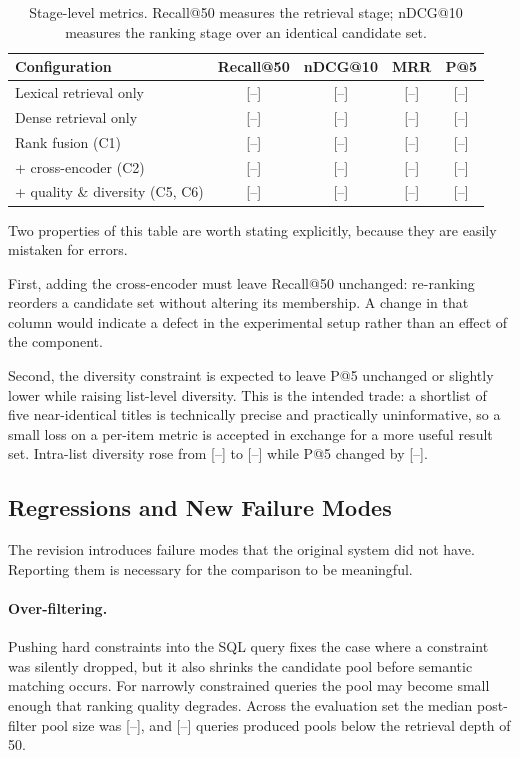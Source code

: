 \begin{table}[h]
\centering
\caption{Stage-level metrics. Recall@50 measures the retrieval stage; nDCG@10
measures the ranking stage over an identical candidate set.}
\label{tab:stage-metrics}
\small
\begin{tabular}{lcccc}
\hline
\textbf{Configuration} & \textbf{Recall@50} & \textbf{nDCG@10} & \textbf{MRR} & \textbf{P@5} \\
\hline
Lexical retrieval only          & [--] & [--] & [--] & [--] \\
Dense retrieval only            & [--] & [--] & [--] & [--] \\
Rank fusion (C1)                & [--] & [--] & [--] & [--] \\
\quad + cross-encoder (C2)      & [--] & [--] & [--] & [--] \\
\quad + quality \& diversity (C5, C6) & [--] & [--] & [--] & [--] \\
\hline
\end{tabular}
\end{table}

Two properties of this table are worth stating explicitly, because they are
easily mistaken for errors.

First, adding the cross-encoder must leave Recall@50 unchanged: re-ranking
reorders a candidate set without altering its membership. A change in that
column would indicate a defect in the experimental setup rather than an effect
of the component.

Second, the diversity constraint is expected to leave P@5 unchanged or slightly
lower while raising list-level diversity. This is the intended trade: a
shortlist of five near-identical titles is technically precise and practically
uninformative, so a small loss on a per-item metric is accepted in exchange for
a more useful result set. Intra-list diversity rose from [--] to [--] while P@5
changed by [--].

\subsection{Regressions and New Failure Modes}
\label{sec:post-eval-regressions}

The revision introduces failure modes that the original system did not have.
Reporting them is necessary for the comparison to be meaningful.

\paragraph{Over-filtering.}
Pushing hard constraints into the SQL query fixes the case where a constraint
was silently dropped, but it also shrinks the candidate pool before semantic
matching occurs. For narrowly constrained queries the pool may become small
enough that ranking quality degrades. Across the evaluation set the median
post-filter pool size was [--], and [--] queries produced pools below the
retrieval depth of 50.

